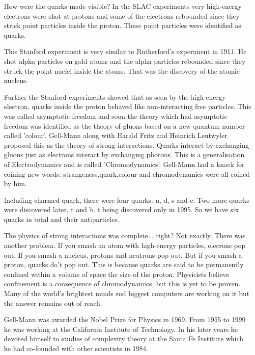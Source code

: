 How were the quarks made visible? In the SLAC experiments very high-energy
electrons were shot at protons and some of the electrons rebounded since
they strick point particles inside the proton. These point particles were
identified as quarks.

This Stanford experiment is very similar to Rutherford's experiment in 1911.
He shot alpha particles on gold atoms and the alpha particles rebounded
since they struck the point nuclei inside the atoms. That was the discovery
of the atomic nucleus.

Further the Stanford experiments showed that as seen by the high-energy electron,
quarks inside the proton behaved like non-interacting free particles. This
was called asymptotic freedom and soon the theory which had asymptotic freedom
was identified as the theory of gluons based on a new quantum number called 'colour'.
Gell-Mann along with Harald Fritz and Heinrich Leutwyler proposed this as the theory
of strong interactions. Quarks interact by exchanging gluons just as electrons
interact by exchanging photons. This is a generalisation of Electrodynamics
and is called 'Chromodynamics'. Gell-Mann had a knack for coining new words:
strangeness,quark,colour and chromodynamics were all coined by him.

Including charmed quark, there were four quarks: u, d, s and c. Two
more quarks were discovered later, t and b, t being discovered only in 1995.
So we have six quarks in total and their antiparticles.

The physics of strong interactions was complete... right? Not exactly. There
was another problem. If you smash an atom with high-energy particles, elecrons
pop out. If you smash a nucleus, protons and neutrons pop out. But if you smash
a proton, quarks do't pop out. This is because quarks are said to be permanently
confined within a volume of space the size of the proton. Physicists believe
confinement is a consequence of chromodynamics, but this is yet to be proven.
Many of the world's brightest minds snd biggest computers are working on it but
the answer remains out of reach.

Gell-Mann was awarded the Nobel Prize for Physics in 1969. From 1955 to 1999 he
was working at the California Institute of Technology. In his later years he
devoted himself to studies of complexity theory at the Santa Fe Institute which
he had co-founded with other scientists in 1984.
